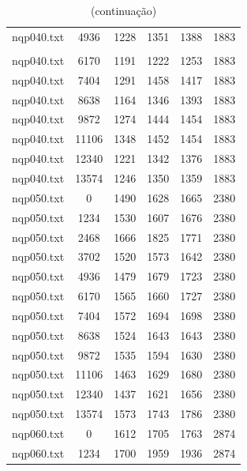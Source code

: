 \documentclass[12pt]{article}
\begin{document}
{\begin{longtable}{c|c|cccc}
		nqp040.txt    &   4936    &   1228   &   1351   &   1388   & 1883       \\
		\caption[]{(continuação)}\\
		nqp040.txt    &   6170    &   1191   &   1222   &   1253   & 1883       \\
		nqp040.txt    &   7404    &   1291   &   1458   &   1417   & 1883       \\
		nqp040.txt    &   8638    &   1164   &   1346   &   1393   & 1883       \\
		nqp040.txt    &   9872    &   1274   &   1444   &   1454   & 1883       \\
		nqp040.txt    &   11106   &   1348   &   1452   &   1454   & 1883       \\
		nqp040.txt    &   12340   &   1221   &   1342   &   1376   & 1883       \\
		nqp040.txt    &   13574   &   1246   &   1350   &   1359   & 1883       \\ \hline
		nqp050.txt    &   0       &   1490   &   1628   &   1665   & 2380       \\
		nqp050.txt    &   1234    &   1530   &   1607   &   1676   & 2380       \\
		nqp050.txt    &   2468    &   1666   &   1825   &   1771   & 2380       \\
		nqp050.txt    &   3702    &   1520   &   1573   &   1642   & 2380       \\
		nqp050.txt    &   4936    &   1479   &   1679   &   1723   & 2380       \\
		nqp050.txt    &   6170    &   1565   &   1660   &   1727   & 2380       \\
		nqp050.txt    &   7404    &   1572   &   1694   &   1698   & 2380       \\
		nqp050.txt    &   8638    &   1524   &   1643   &   1643   & 2380       \\
		nqp050.txt    &   9872    &   1535   &   1594   &   1630   & 2380       \\
		nqp050.txt    &   11106   &   1463   &   1629   &   1680   & 2380       \\
		nqp050.txt    &   12340   &   1437   &   1621   &   1656   & 2380       \\
		nqp050.txt    &   13574   &   1573   &   1743   &   1786   & 2380       \\ \hline
		nqp060.txt    &   0       &   1612   &   1705   &   1763   & 2874       \\
		nqp060.txt    &   1234    &   1700   &   1959   &   1936   & 2874       \\

\end{longtable}}
\end{document}
